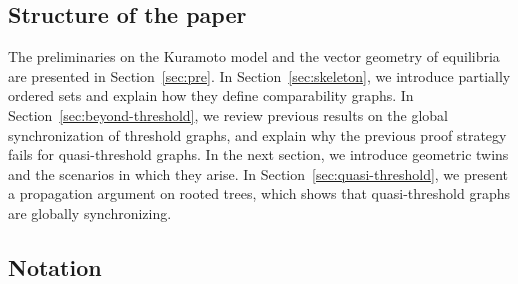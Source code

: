 \documentclass[11pt,reqno]{amsart}
\theoremstyle{definition}
\begin{document}

\subsection{Structure of the paper}
The preliminaries on the Kuramoto model and the vector geometry of equilibria are presented in Section~\ref{sec:pre}.
In Section~\ref{sec:skeleton}, we introduce partially ordered sets and explain how they define comparability graphs.
In Section~\ref{sec:beyond-threshold}, we review previous results on the global synchronization of threshold graphs, and explain why the previous proof strategy fails for quasi-threshold graphs.
In the next section, we introduce geometric twins and the scenarios in which they arise.
In Section~\ref{sec:quasi-threshold}, we present a propagation argument on rooted trees, which shows that quasi-threshold graphs are globally synchronizing.
\subsection{Notation}\label{notation}
\end{document}
